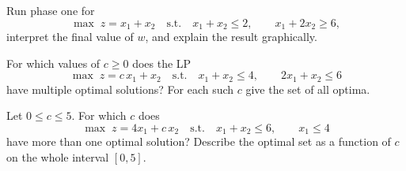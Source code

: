 \begin{problems}
  \item Run phase one for
        \[
          \max\; z=x_1+x_2
          \quad\text{s.t.}\quad
          x_1+x_2\le 2,\qquad x_1+2x_2\ge 6 ,
        \]
        interpret the final value of $w$, and explain the result
        graphically.

  \item For which values of $c\ge 0$ does the LP
        \[
          \max\; z=c\,x_1+x_2
          \quad\text{s.t.}\quad
          x_1+x_2\le 4,\qquad 2x_1+x_2\le 6
        \]
        have multiple optimal solutions? For each such $c$ give the set of
        all optima.

  \item Let $0\le c\le 5$. For which $c$ does
        \[
          \max\; z=4x_1+c\,x_2
          \quad\text{s.t.}\quad
          x_1+x_2\le 6,\qquad x_1\le 4
        \]
        have more than one optimal solution? Describe the optimal set as a
        function of $c$ on the whole interval $[0,5]$.


\end{problems}

